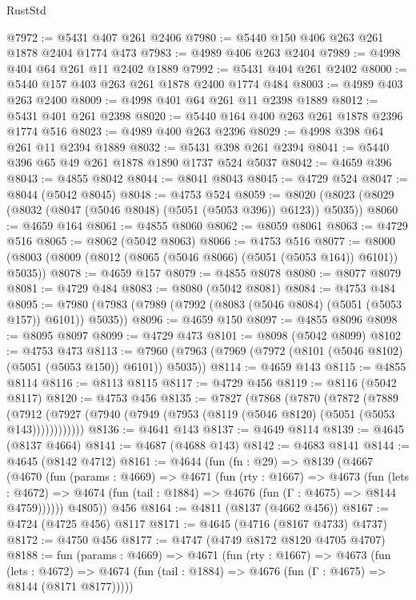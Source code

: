 \begin{lexlean}{RustStd}
\begin{coremodule}
@7972 := @5431 @407 @261 @2406
@7980 := @5440 @150 @406 @263 @261 @1878 @2404 @1774 @473
@7983 := @4989 @406 @263 @2404
@7989 := @4998 @404 @64 @261 @11 @2402 @1889
@7992 := @5431 @404 @261 @2402
@8000 := @5440 @157 @403 @263 @261 @1878 @2400 @1774 @484
@8003 := @4989 @403 @263 @2400
@8009 := @4998 @401 @64 @261 @11 @2398 @1889
@8012 := @5431 @401 @261 @2398
@8020 := @5440 @164 @400 @263 @261 @1878 @2396 @1774 @516
@8023 := @4989 @400 @263 @2396
@8029 := @4998 @398 @64 @261 @11 @2394 @1889
@8032 := @5431 @398 @261 @2394
@8041 := @5440 @396 @65 @49 @261 @1878 @1890 @1737 @524 @5037
@8042 := @4659 @396
@8043 := @4855 @8042
@8044 := @8041 @8043
@8045 := @4729 @524
@8047 := @8044 (@5042 @8045)
@8048 := @4753 @524
@8059 := @8020 (@8023 (@8029 (@8032 (@8047 (@5046 @8048) (@5051 (@5053 @396)) @6123)) @5035))
@8060 := @4659 @164
@8061 := @4855 @8060
@8062 := @8059 @8061
@8063 := @4729 @516
@8065 := @8062 (@5042 @8063)
@8066 := @4753 @516
@8077 := @8000 (@8003 (@8009 (@8012 (@8065 (@5046 @8066) (@5051 (@5053 @164)) @6101)) @5035))
@8078 := @4659 @157
@8079 := @4855 @8078
@8080 := @8077 @8079
@8081 := @4729 @484
@8083 := @8080 (@5042 @8081)
@8084 := @4753 @484
@8095 := @7980 (@7983 (@7989 (@7992 (@8083 (@5046 @8084) (@5051 (@5053 @157)) @6101)) @5035))
@8096 := @4659 @150
@8097 := @4855 @8096
@8098 := @8095 @8097
@8099 := @4729 @473
@8101 := @8098 (@5042 @8099)
@8102 := @4753 @473
@8113 := @7960 (@7963 (@7969 (@7972 (@8101 (@5046 @8102) (@5051 (@5053 @150)) @6101)) @5035))
@8114 := @4659 @143
@8115 := @4855 @8114
@8116 := @8113 @8115
@8117 := @4729 @456
@8119 := @8116 (@5042 @8117)
@8120 := @4753 @456
@8135 := @7827
    (@7868
      (@7870
        (@7872
          (@7889
            (@7912 (@7927 (@7940 (@7949 (@7953 (@8119 (@5046 @8120) (@5051 (@5053 @143))))))))))))
@8136 := @4641 @143
@8137 := @4649 @8114
@8139 := @4645 (@8137 @4664)
@8141 := @4687 (@4688 @143)
@8142 := @4683 @8141
@8144 := @4645 (@8142 @4712)
@8161 := @4644
    (fun (fn : @29) =>
    @8139
      (@4667
        (@4670
          (fun (params : @4669) =>
          @4671
            (fun (rty : @1667) =>
            @4673
              (fun (lets : @4672) =>
              @4674 (fun (tail : @1884) => @4676 (fun (Γ : @4675) => @8144 @4759))))))
        @4805))
    @456
@8164 := @4811 (@8137 (@4662 @456))
@8167 := @4724 (@4725 @456) @8117
@8171 := @4645 (@4716 (@8167 @4733) @4737)
@8172 := @4750 @456
@8177 := @4747 (@4749 @8172 @8120 @4705 @4707)
@8188 := fun (params : @4669) =>
  @4671
    (fun (rty : @1667) =>
    @4673
      (fun (lets : @4672) =>
      @4674 (fun (tail : @1884) => @4676 (fun (Γ : @4675) => @8144 (@8171 @8177)))))

\end{coremodule}
\end{lexlean}
